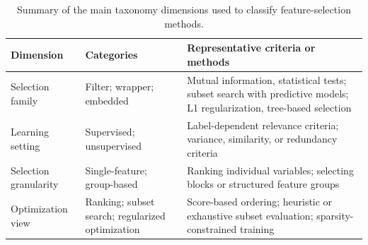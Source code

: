 \begin{table}[H]
\centering
\renewcommand{\arraystretch}{1.18}
\caption{Summary of the main taxonomy dimensions used to classify feature-selection methods.}
\label{tab:feature-selection-taxonomy-summary}
\begin{tabular}{>{\raggedright\arraybackslash}p{} >{\raggedright\arraybackslash}p{} >{\raggedright\arraybackslash}p{}}
  \toprule
  \textbf{Dimension} & \textbf{Categories} & \textbf{Representative criteria or methods} \\
  \midrule
  Selection family & Filter; wrapper; embedded & Mutual information, statistical tests; subset search with predictive models; L1 regularization, tree-based selection \\
  Learning setting & Supervised; unsupervised & Label-dependent relevance criteria; variance, similarity, or redundancy criteria \\
  Selection granularity & Single-feature; group-based & Ranking individual variables; selecting blocks or structured feature groups \\
  Optimization view & Ranking; subset search; regularized optimization & Score-based ordering; heuristic or exhaustive subset evaluation; sparsity-constrained training \\
  \bottomrule
\end{tabular}
\renewcommand{\arraystretch}{1.0}
\end{table}

